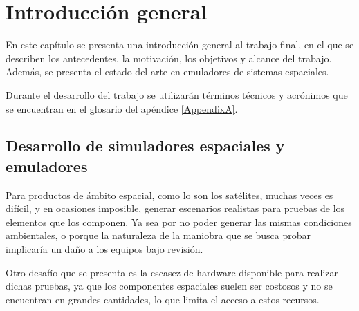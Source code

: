 
\chapter{Introducción general} %

\label{Chapter1} %
\label{IntroGeneral}


\newcommand{\keyword}[1]{\textbf{#1}}
\newcommand{\tabhead}[1]{\textbf{#1}}
\newcommand{\code}[1]{\texttt{#1}}
\newcommand{\file}[1]{\texttt{\bfseries#1}}
\newcommand{\option}[1]{\texttt{\itshape#1}}
\newcommand{\grados}{$^{\circ}$}


En este capítulo se presenta una introducción general al trabajo final, en el que se describen los antecedentes, la motivación, los objetivos y alcance del trabajo. Además, se presenta el estado del arte en emuladores de sistemas espaciales.

Durante el desarrollo del trabajo se utilizarán términos técnicos y acrónimos que se encuentran en el glosario del apéndice \ref{AppendixA}.

\section{Desarrollo de simuladores espaciales y emuladores}
\label{sec:desarrollo_simuladores_emuladores}


Para productos de ámbito espacial, como lo son los satélites, muchas veces es difícil, y en ocasiones imposible, generar escenarios realistas para pruebas de los elementos que los componen. Ya sea por no poder generar las mismas condiciones ambientales, o porque la naturaleza de la maniobra que se busca probar implicaría un daño a los equipos bajo revisión.

Otro desafío que se presenta es la escasez de hardware disponible para realizar dichas pruebas, ya que los componentes espaciales suelen ser costosos y no se encuentran en grandes cantidades, lo que limita el acceso a estos recursos.

